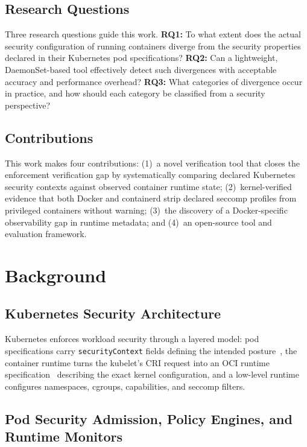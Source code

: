 \documentclass[conference]{IEEEtran}
\begin{document}
\subsection{Research Questions}

Three research questions guide this work. \textbf{RQ1:} To what extent does the actual security configuration of running containers diverge from the security properties declared in their Kubernetes pod specifications? \textbf{RQ2:} Can a lightweight, DaemonSet-based tool effectively detect such divergences with acceptable accuracy and performance overhead? \textbf{RQ3:} What categories of divergence occur in practice, and how should each category be classified from a security perspective?

\subsection{Contributions}

This work makes four contributions: (1)~a novel verification tool that closes the enforcement verification gap by systematically comparing declared Kubernetes security contexts against observed container runtime state; (2)~kernel-verified evidence that both Docker and containerd strip declared seccomp profiles from privileged containers without warning; (3)~the discovery of a Docker-specific observability gap in runtime metadata; and (4)~an open-source tool and evaluation framework.

\section{Background}

\subsection{Kubernetes Security Architecture}

Kubernetes enforces workload security through a layered model: pod specifications carry \texttt{securityContext} fields defining the intended posture~\cite{k8sseccomp2024}, the container runtime turns the kubelet's CRI request into an OCI runtime specification~\cite{ocispec2023} describing the exact kernel configuration, and a low-level runtime configures namespaces, cgroups, capabilities, and seccomp filters.

\subsection{Pod Security Admission, Policy Engines, and Runtime Monitors}
\end{document}
